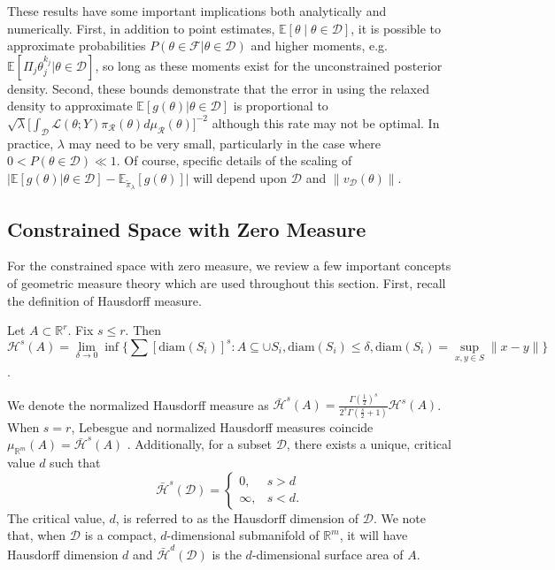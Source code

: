 \documentclass[10pt,fleqn]{article}
\newcommand{\bb}[1]{\mathbb{#1}} \newcommand{\mc}[1]{\mathcal{#1}}
\DeclareMathOperator{\1}{\mathbbm{1}} \DeclareMathOperator{\bigO}{\mc O}
\begin{document}
These results have some important implications both analytically and
numerically.  First, in addition to point estimates,
$\bb E[\theta \mid \theta\in\mathcal{D}]$, it is possible to approximate
probabilities $P(\theta \in \mathcal{F}|\theta \in \mathcal{D})$ and higher
moments, e.g. $\bb E[\Pi_j \theta_j^{k_j} |\theta\in\mathcal{D}]$, so long as
these moments exist for the unconstrained posterior density. Second, these bounds demonstrate that the error in using the relaxed
density to approximate $\bb E[g(\theta)|\theta\in\mathcal{D}]$ is proportional
to $\sqrt{\lambda} [\int_\mathcal{D}\mathcal{L}(\theta; Y)
\pi_\mathcal{R}(\theta)d\mu_\mathcal{R}(\theta)\big]^{-2}$ although this
rate may not be optimal.  In practice, $\lambda$ may need to be very small,
particularly in the case where $0<P(\theta\in\mathcal{D})\ll 1.$ Of course,
specific details of the scaling of $\bigg|\bb E[g(\theta)
|\theta\in\mathcal{D}] - \bb E_{\tilde{\pi}_\lambda}[g(\theta)]   \bigg|$ will
depend upon $\mathcal{D}$ and $\|v_{\mc D}(\theta)\|$.

\subsection{Constrained Space with Zero Measure}
\label{SEC:Zero_measure_theory}

For the constrained space with zero measure, we review a few important concepts of
geometric measure theory which are used throughout this section.  First,
recall the definition of Hausdorff measure.  \begin{Hausdorff_def} Let
$A\subset \bb R^r$. Fix $s \le r$. Then $$\mc H^{s}(A)=
\underset{\delta\rightarrow 0}\lim \inf \bigg\{ \sum
\left[{\text{diam}(S_i)}\right]^s: {A\subseteq \cup S_i,
\text{diam}(S_i)\le \delta}, \text{diam}(S_i)=\sup_{x,y\in
S}\|x-y\|\bigg\}$$.  \end{Hausdorff_def} We denote the normalized Hausdorff
measure as $\bar{\mc H}^{s}(A) =\frac{\Gamma(\frac{1}{2})^{s}}{2^s
\Gamma(\frac{s}{2}+1)} \mc H^{s}(A)$. When $s=r$, Lebesgue and normalized
Hausdorff measures coincide  $\mu_{\mathbb{R}^m}(A)= \bar{\mc H}^{s}(A)$
\citep{evans2015measure}.  Additionally, for a subset $\mathcal{D}$, there
exists a unique, critical value $d$ such that
$$\bar{\mathcal{H}}^s(\mathcal{D}) = \begin{cases} 0, & s > d \\ \infty, &
s < d.\end{cases}$$ The critical value, $d$, is referred to as the
Hausdorff dimension of $\mathcal{D}$. We note that, when $\mathcal{D}$ is a
compact, $d$-dimensional submanifold of $\mathbb{R}^m$, it will have
Hausdorff dimension $d$ and $\bar{\mathcal{H}}^d(\mathcal{D})$ is the
$d$-dimensional surface area of $A.$
\end{document}
